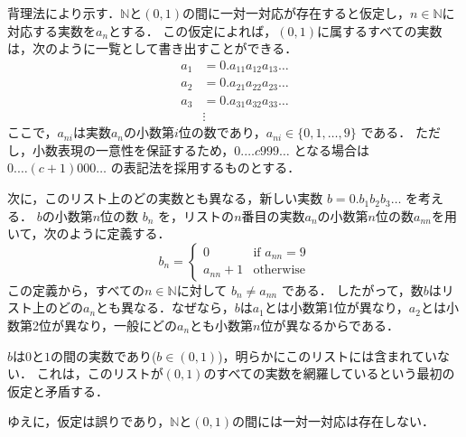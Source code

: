 \begin{tproof}
  背理法により示す．$\mathbb{N}$と$(0,1)$の間に一対一対応が存在すると仮定し，$n \in \mathbb{N}$に対応する実数を$a_n$とする．
  この仮定によれば，$(0,1)$に属するすべての実数は，次のように一覧として書き出すことができる．
  \begin{align*}
    a_1 &= 0.a_{11}a_{12}a_{13}\dots \\
    a_2 &= 0.a_{21}a_{22}a_{23}\dots \\
    a_3 &= 0.a_{31}a_{32}a_{33}\dots \\
    &\vdots
  \end{align*}
  ここで，$a_{ni}$は実数$a_n$の小数第$i$位の数であり，$a_{ni} \in \{0, 1, \dots, 9\}$ である．
  ただし，小数表現の一意性を保証するため，$0.\dots c999\dots$ となる場合は $0.\dots(c+1)000\dots$ の表記法を採用するものとする．

  次に，このリスト上のどの実数とも異なる，新しい実数 $b = 0.b_1b_2b_3\dots$ を考える．
  $b$の小数第$n$位の数 $b_n$ を，リストの$n$番目の実数$a_n$の小数第$n$位の数$a_{nn}$を用いて，次のように定義する．
  \[
b_n = 
\begin{cases}
  0 & \text{if } a_{nn} = 9 \\
  a_{nn} + 1 & \text{otherwise}
\end{cases}
\]
  この定義から，すべての$n \in \mathbb{N}$に対して $b_n \neq a_{nn}$ である．
  したがって，数$b$はリスト上のどの$a_n$とも異なる．なぜなら，$b$は$a_1$とは小数第1位が異なり，$a_2$とは小数第2位が異なり，一般にどの$a_n$とも小数第$n$位が異なるからである．

  $b$は$0$と$1$の間の実数であり($b \in (0,1)$)，明らかにこのリストには含まれていない．
  これは，このリストが$(0,1)$のすべての実数を網羅しているという最初の仮定と矛盾する．

  ゆえに，仮定は誤りであり，$\mathbb{N}$と$(0,1)$の間には一対一対応は存在しない．
\end{tproof}